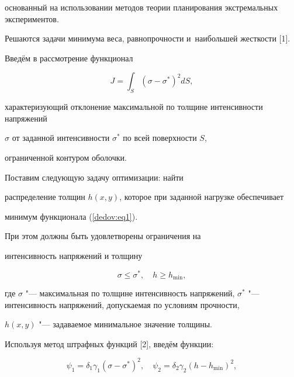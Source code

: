 основанный на использовании методов теории планирования экстремальных экспериментов.

Решаются задачи минимума веса, равнопрочности и~наибольшей жесткости [1].

Введём в рассмотрение функционал

\begin{equation}

\label{dedov:eq1}

J=\int_S (\sigma -\sigma ^\ast )^2dS ,

\end{equation}

характеризующий отклонение максимальной по толщине интенсивности напряжений

$\sigma $ от заданной интенсивности $\sigma ^\ast $ по всей поверхности $S$,

ограниченной контуром оболочки.

Поставим следующую задачу оптимизации: найти

распределение толщин $h(x, y)$, которое при заданной нагрузке обеспечивает

минимум функционала (\ref{dedov:eq1}).

При этом должны быть удовлетворены ограничения на

интенсивность напряжений и толщину

\begin{equation}

\label{dedov:eq2}

\sigma \leqslant \sigma ^\ast , \quad

h\geqslant h_{\min } ,

\end{equation}

где $\sigma $ "--- максимальная по толщине интенсивность напряжений, $\sigma

^\ast $ "--- интенсивность напряжений, допускаемая по условиям прочности,

$h(x, y)$ "--- задаваемое минимальное значение толщины.



\renewcommand{\baselinestretch}{1.1}



Используя метод штрафных функций [2], введём функции:

\[

\psi _1 =\delta _1 \gamma _1 (\sigma -\sigma ^\ast )^2,

\quad

\psi _2 =\delta _2 \gamma _2 (h-h_{\min } )^2,

\]

